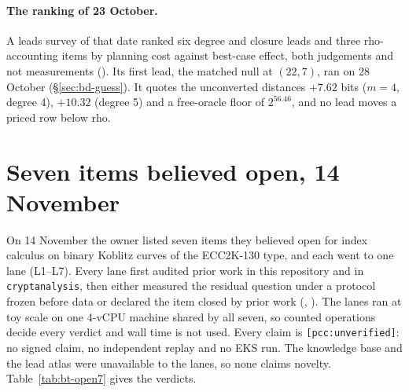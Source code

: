 \paragraph{The ranking of 23 October.} A leads survey of that date ranked
six degree and closure leads and three rho-accounting items by planning
cost against best-case effect, both judgements and not measurements
(). Its first lead,
the matched null at $(22,7)$, ran on 28 October (\S\ref{sec:bd-guess}). It
quotes the unconverted distances $+7.62$ bits ($m=4$, degree 4), $+10.32$
(degree 5) and a free-oracle floor of $2^{56.46}$, and no lead moves a priced
row below rho.

\section{Seven items believed open, 14 November}\label{sec:bt-open7}

On 14 November the owner listed seven items they believed open for index
calculus on binary Koblitz curves of the ECC2K-130 type, and each went to
one lane (L1--L7). Every lane first audited prior work in this repository
and in \texttt{cryptanalysis}, then either measured the residual question
under a protocol frozen before data or declared the item closed by prior
work (,
). The lanes ran at toy
scale on one 4-vCPU machine shared by all seven, so counted operations
decide every verdict and wall time is not used. Every claim is
\texttt{[pcc:unverified]}: no signed claim, no independent replay and no
EKS run. The knowledge base and the lead atlas were unavailable to the
lanes, so none claims novelty. Table~\ref{tab:bt-open7} gives the
verdicts.


